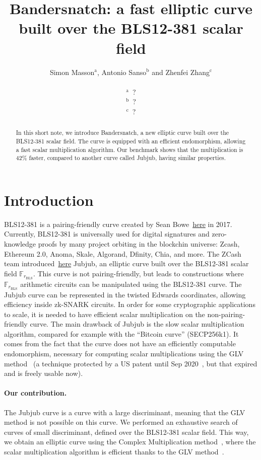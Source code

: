 \documentclass{article}
\title{Bandersnatch: a fast elliptic curve built over the BLS12-381
  scalar field}
\author{Simon Masson${}^\text{a}$, Antonio Sanso${}^\text{b}$ and
  Zhenfei Zhang${}^\text{c}$\\
  \ \\
  ${}^\text{a}$~?\\
  ${}^\text{b}$~?\\
  ${}^\text{c}$~?}
\makeatletter
\theoremstyle{definition}
\newcommand{\verbatimfont}[1]{\renewcommand{\verbatim@font}{\ttfamily#1}}
\makeatother
\begin{document}
\verbatimfont{\small}%

\maketitle
\medskip
\begin{abstract}
 In this short note, we introduce Bandersnatch, a new elliptic curve
 built over the BLS12-381 scalar field. The curve is equipped with an efficient
 endomorphism, allowing a fast scalar multiplication algorithm.
 Our benchmark shows that the multiplication is 42\% faster, 
 compared to another curve called Jubjub, having similar properties.
\end{abstract}

\section{Introduction}
BLS12-381 is a pairing-friendly curve created by Sean
Bowe~\href{https://electriccoin.co/blog/new-snark-curve/}{here} in 2017.
Currently, BLS12-381 is universally used for digital
signatures and zero-knowledge proofs by many project orbiting in the
blockchin universe: Zcash, Ethereum 2.0, Anoma, Skale, Algorand, Dfinity,
Chia, and more.
The ZCash team
introduced~\href{https://z.cash/technology/jubjub/}{here} Jubjub, an
elliptic curve built over the BLS12-381 scalar field $\mathbb
F_{r_\text{BLS}}$.
This curve is not pairing-friendly, but leads to constructions where
$\mathbb F_{r_\text{BLS}}$ arithmetic circuits can be manipulated
using the BLS12-381 curve.
The Jubjub curve can be represented in the twisted Edwards
coordinates, allowing efficiency inside zk-SNARK circuits.
In order for some cryptographic applications to scale, it is needed to
have efficient scalar multiplication on the non-pairing-friendly
curve.
The main drawback of Jubjub is the slow scalar multiplication
algorithm, compared for example with the ``Bitcoin curve''
(SECP256k1).
It comes from the fact that the curve does not have an efficiently
computable endomorphism, necessary for computing scalar
multiplications using the GLV method~\cite{C:GalLamVan01} (a technique
protected by a US patent until Sep 2020~\cite{glvpatent}, but that 
expired and is
freely usable now).

\paragraph{Our contribution.}
The Jubjub curve is a curve with a large discriminant, meaning that
the GLV method is not possible on this curve.
We performed an exhaustive search of curves of small discriminant,
defined over the BLS12-381 scalar field. This way, we obtain an
elliptic curve using the Complex Multiplication
method~\cite{MC:AtkMor93}, where the scalar multiplication algorithm
is efficient thanks to the GLV method~\cite{C:GalLamVan01}.
\end{document}
